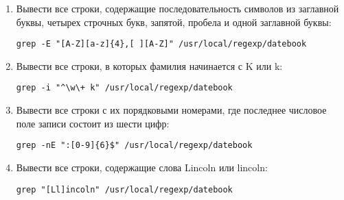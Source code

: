 \documentclass[listings]{labreport}
\begin{document}
\begin{enumerate}
\item Вывести все строки, содержащие последовательность символов из
  заглавной буквы, четырех строчных букв, запятой, пробела и одной заглавной буквы:
\begin{verbatim}
grep -E "[A-Z][a-z]{4},[ ][A-Z]" /usr/local/regexp/datebook
\end{verbatim}

\item Вывести все строки, в которых фамилия начинается с K или k:
\begin{verbatim}
grep -i "^\w\+ k" /usr/local/regexp/datebook
\end{verbatim}

\item Вывести все строки с их порядковыми номерами, где последнее числовое поле записи состоит из шести цифр:
\begin{verbatim}
grep -nE ":[0-9]{6}$" /usr/local/regexp/datebook
\end{verbatim}

\item Вывести все строки, содержащие слова Lincoln или lincoln:
\begin{verbatim}
grep "[Ll]incoln" /usr/local/regexp/datebook
\end{verbatim}

\end{enumerate}
\end{document}
